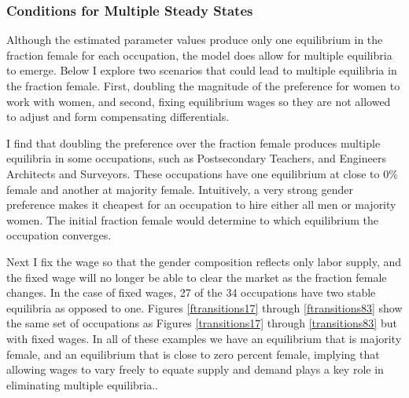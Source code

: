 \documentclass[12pt]{article}
\begin{document}

\subsubsection{Conditions for Multiple Steady States}
Although the estimated parameter values produce only one equilibrium in the fraction female for each occupation, the model does allow for multiple equilibria to emerge. Below I explore two scenarios that could lead to multiple equilibria in the fraction female. First, doubling the magnitude of the preference for women to work with women, and second, fixing equilibrium wages so they are not allowed to adjust and form compensating differentials.


I find that doubling the preference over the fraction female produces multiple equilibria in some occupations, such as Postsecondary Teachers, and Engineers Architects and Surveyors. These occupations have one equilibrium at close to 0\% female and another at majority female. Intuitively, a very strong gender preference makes it cheapest for an occupation to hire either all men or majority women. The initial fraction female would determine to which equilibrium the occupation converges. 


Next I fix the wage so that the gender composition reflects only labor supply, and the fixed wage will no longer be able to clear the market as the fraction female changes. In the case of fixed wages, 27 of the 34 occupations have two stable equilibria as opposed to one. Figures \ref{ftransitions17} through \ref{ftransitions83} show the same set of occupations as Figures \ref{transitions17} through \ref{transitions83} but with fixed wages. In all of these examples we have an equilibrium that is majority female, and an equilibrium that is close to zero percent female, implying that allowing wages to vary freely to equate supply and demand plays a key role in eliminating multiple equilibria..
\end{document}
